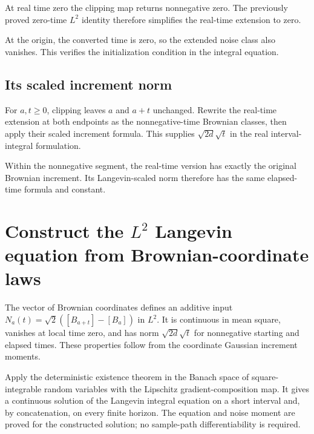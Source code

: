\documentclass[11pt,a4paper]{report}
\begin{document}
At real time zero the clipping map returns nonnegative zero. The previously proved zero-time \(L^2\) identity therefore simplifies the real-time extension to zero.



At the origin, the converted time is zero, so the extended noise class also vanishes. This verifies the initialization condition in the integral equation.

\subsection{\texorpdfstring{Its scaled increment norm}{Its scaled increment norm}}
\label{report-step-UnadjustedLangevin-GaussianCoordinates-lean-24}


For \(a,t\ge0\), clipping leaves \(a\) and \(a+t\) unchanged. Rewrite the real-time extension at both endpoints as the nonnegative-time Brownian classes, then apply their scaled increment formula. This supplies \(\sqrt{2d}\sqrt t\) in the real interval-integral formulation.



Within the nonnegative segment, the real-time version has exactly the original Brownian increment. Its Langevin-scaled norm therefore has the same elapsed-time formula and constant.

\section{\texorpdfstring{Construct the \(L^2\) Langevin equation from Brownian-coordinate laws}{Construct the L² Langevin equation from Brownian-coordinate laws}}
\label{proof-module-UnadjustedLangevin-BrownianLangevin-lean}


The vector of Brownian coordinates defines an additive input \(N_a(t)=\sqrt2([B_{a+t}]-[B_a])\) in \(L^2\). It is continuous in mean square, vanishes at local time zero, and has norm \(\sqrt{2d}\sqrt t\) for nonnegative starting and elapsed times. These properties follow from the coordinate Gaussian increment moments.



Apply the deterministic existence theorem in the Banach space of square-integrable random variables with the Lipschitz gradient-composition map. It gives a continuous solution of the Langevin integral equation on a short interval and, by concatenation, on every finite horizon. The equation and noise moment are proved for the constructed solution; no sample-path differentiability is required.
\end{document}
